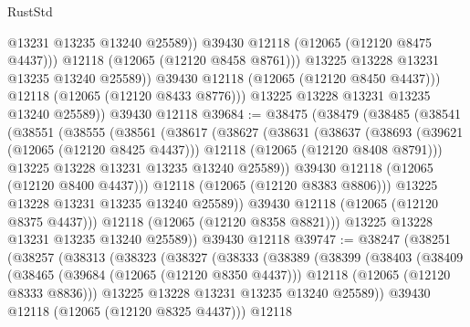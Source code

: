 \begin{lexlean}{RustStd}
\begin{coremodule}
                        @13231
                        @13235
                        @13240
                        @25589))
                    @39430
                    @12118
                    (@12065 (@12120 @8475 @4437)))
                  @12118
                  (@12065 (@12120 @8458 @8761)))
                @13225
                @13228
                @13231
                @13235
                @13240
                @25589))
            @39430
            @12118
            (@12065 (@12120 @8450 @4437)))
          @12118
          (@12065 (@12120 @8433 @8776)))
        @13225
        @13228
        @13231
        @13235
        @13240
        @25589))
    @39430
    @12118
@39684 := @38475
    (@38479
      (@38485
        (@38541
          (@38551
            (@38555
              (@38561
                (@38617
                  (@38627
                    (@38631
                      (@38637
                        (@38693
                          (@39621 (@12065 (@12120 @8425 @4437)))
                          @12118
                          (@12065 (@12120 @8408 @8791)))
                        @13225
                        @13228
                        @13231
                        @13235
                        @13240
                        @25589))
                    @39430
                    @12118
                    (@12065 (@12120 @8400 @4437)))
                  @12118
                  (@12065 (@12120 @8383 @8806)))
                @13225
                @13228
                @13231
                @13235
                @13240
                @25589))
            @39430
            @12118
            (@12065 (@12120 @8375 @4437)))
          @12118
          (@12065 (@12120 @8358 @8821)))
        @13225
        @13228
        @13231
        @13235
        @13240
        @25589))
    @39430
    @12118
@39747 := @38247
    (@38251
      (@38257
        (@38313
          (@38323
            (@38327
              (@38333
                (@38389
                  (@38399
                    (@38403
                      (@38409
                        (@38465
                          (@39684 (@12065 (@12120 @8350 @4437)))
                          @12118
                          (@12065 (@12120 @8333 @8836)))
                        @13225
                        @13228
                        @13231
                        @13235
                        @13240
                        @25589))
                    @39430
                    @12118
                    (@12065 (@12120 @8325 @4437)))
                  @12118

\end{coremodule}
\end{lexlean}
